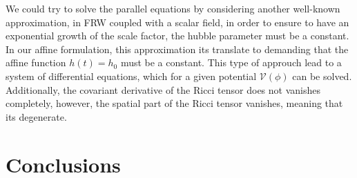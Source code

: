 \documentclass[10pt,a4paper]{article}
\begin{document}
We could try to solve the parallel equations by considering another well-known approximation, in FRW coupled with a scalar field, in order to ensure
to have an exponential growth of the scale factor, the hubble parameter must be a constant. In our affine formulation, this approximation its translate to demanding
that the affine function $h(t) = h_0$ must be a constant. This type of approuch lead to a system of differential equations, which for a given potential $\mathcal{V}(\phi)$
can be solved. Additionally, the covariant derivative of the Ricci tensor does not vanishes completely, however, the spatial part of the Ricci tensor
vanishes, meaning that its degenerate.



\section{Conclusions}
\end{document}
